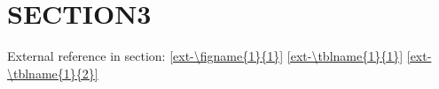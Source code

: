 \section{SECTION3}
\lipsum[5-7]

\cite{smit54,colu92,gree00,phil99,jame76}

External reference in section:
\ref{ext-\figname{1}{1}}
\ref{ext-\tblname{1}{1}}
\ref{ext-\tblname{1}{2}}
